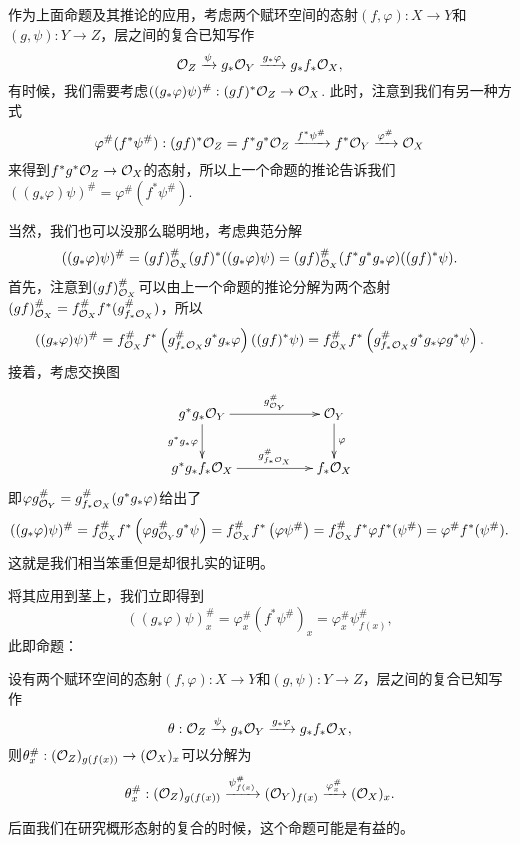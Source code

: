 \begin{para}
	作为上面命题及其推论的应用，考虑两个赋环空间的态射$(f,\varphi):X\to Y$和$(g,\psi):Y\to Z$，层之间的复合已知写作
	\[
		\mathcal{O}_Z\xrightarrow{\psi} g_*\mathcal{O}_Y\xrightarrow{g_*\varphi} g_*f_*\mathcal{O}_X,
	\]
	有时候，我们需要考虑$((g_*\varphi)\psi)^\#:(gf)^*\mathcal{O}_Z\to \mathcal{O}_X$. 此时，注意到我们有另一种方式
	\[
		\varphi^\#(f^*\psi^\#):(gf)^*\mathcal{O}_Z=f^*g^*\mathcal{O}_Z\xrightarrow{f^*\psi^\#}f^*\mathcal{O}_Y\xrightarrow{\varphi^\#}\mathcal{O}_X
	\]
	来得到$f^*g^*\mathcal{O}_Z\to \mathcal{O}_X$的态射，所以上一个命题的推论告诉我们$((g_*\varphi)\psi)^\#=\varphi^\#(f^*\psi^\#)$. 

	当然，我们也可以没那么聪明地，考虑典范分解
	\[
		((g_*\varphi)\psi)^\#=(gf)^\#_{\mathcal{O}_X} (gf)^*((g_*\varphi)\psi)=(gf)^\#_{\mathcal{O}_X} (f^*g^*g_*\varphi)((gf)^*\psi).
	\]
	首先，注意到$(gf)^\#_{\mathcal{O}_X}$可以由上一个命题的推论分解为两个态射$(gf)^\#_{\mathcal{O}_X}=f_{\mathcal{O}_X}^\# f^*(g_{f_*\mathcal{O}_X}^\#)$，所以
	\[
		((g_*\varphi)\psi)^\#=f_{\mathcal{O}_X}^\# f^* \left(g_{f_*\mathcal{O}_X}^\# g^*g_*\varphi\right)((gf)^*\psi)=f_{\mathcal{O}_X}^\# f^* \left(g_{f_*\mathcal{O}_X}^\# g^*g_*\varphi g^*\psi\right).
	\]
	接着，考虑交换图
	\[
		\xymatrix{
			g^*g_*\oo_Y \ar[d]_{g^*g_*\varphi}\ar[rr]^-{g_{\oo_Y}^\#}&&\oo_Y\ar[d]^\varphi\\
			g^*g_*f_*\oo_X\ar[rr]^-{g_{f_*\oo_X}^\#}&&f_*\oo_X
		}
	\]
	即$\varphi g_{\mathcal{O}_Y}^\#=g_{f_*\mathcal{O}_X}^\#(g^*g_*\varphi)$给出了
	\[
		((g_*\varphi)\psi)^\#=f_{\mathcal{O}_X}^\# f^* \left(\varphi g_{\mathcal{O}_Y}^\# g^*\psi\right)=f_{\mathcal{O}_X}^\# f^* \left(\varphi \psi^\#\right)=f_{\mathcal{O}_X}^\# f^* \varphi f^*(\psi^\#)=\varphi^\# f^*(\psi^\#).
	\]
	这就是我们相当笨重但是却很扎实的证明。
\end{para}

将其应用到茎上，我们立即得到
\[
	((g_*\varphi)\psi)^\#_x=\varphi^\#_x(f^*\psi^\#)_x=\varphi^\#_x \psi^\#_{f(x)},
\]
此即命题：

\begin{pro}\label{pro:morcom}
	设有两个赋环空间的态射$(f,\varphi):X\to Y$和$(g,\psi):Y\to Z$，层之间的复合已知写作
	\[
		\theta:\mathcal{O}_Z\xrightarrow{\psi} g_*\mathcal{O}_Y\xrightarrow{g_*\varphi} g_*f_*\mathcal{O}_X,
	\]
	则$\theta^\#_x:(\mathcal{O}_Z)_{g(f(x))}\to (\mathcal{O}_X)_x$可以分解为
	\[
		\theta^\#_x:(\mathcal{O}_Z)_{g(f(x))}\xrightarrow{\psi^\#_{f(x)}}(\mathcal{O}_Y)_{f(x)}\xrightarrow{\varphi^\#_x} (\mathcal{O}_X)_x.
	\]
\end{pro}

后面我们在研究概形态射的复合的时候，这个命题可能是有益的。

